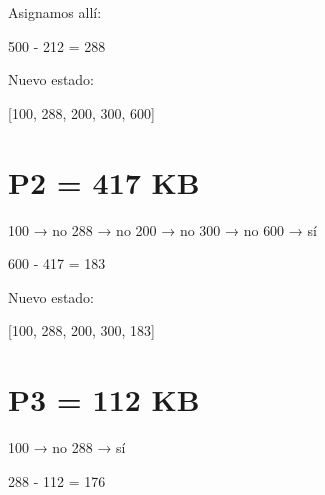 \documentclass[
  spanish,
  letterpaper,
]{scrbook}
\newenvironment{Shaded}{\begin{snugshade}}{\end{snugshade}}
\newcommand{\NormalTok}[1]{\textcolor[rgb]{0.00,0.23,0.31}{#1}}
\begin{document}
Asignamos allí:

\begin{Shaded}
\begin{Highlighting}[]
\NormalTok{500 {-} 212 = 288}
\end{Highlighting}
\end{Shaded}

Nuevo estado:

\begin{Shaded}
\begin{Highlighting}[]
\NormalTok{[100, 288, 200, 300, 600]}
\end{Highlighting}
\end{Shaded}

\section{P2 = 417 KB}\label{p2-417-kb-3}

\begin{Shaded}
\begin{Highlighting}[]
\NormalTok{100 → no}
\NormalTok{288 → no}
\NormalTok{200 → no}
\NormalTok{300 → no}
\NormalTok{600 → sí}
\end{Highlighting}
\end{Shaded}

\begin{Shaded}
\begin{Highlighting}[]
\NormalTok{600 {-} 417 = 183}
\end{Highlighting}
\end{Shaded}

Nuevo estado:

\begin{Shaded}
\begin{Highlighting}[]
\NormalTok{[100, 288, 200, 300, 183]}
\end{Highlighting}
\end{Shaded}

\section{P3 = 112 KB}\label{p3-112-kb-3}

\begin{Shaded}
\begin{Highlighting}[]
\NormalTok{100 → no}
\NormalTok{288 → sí}
\end{Highlighting}
\end{Shaded}

\begin{Shaded}
\begin{Highlighting}[]
\NormalTok{288 {-} 112 = 176}
\end{Highlighting}
\end{Shaded}
\end{document}
